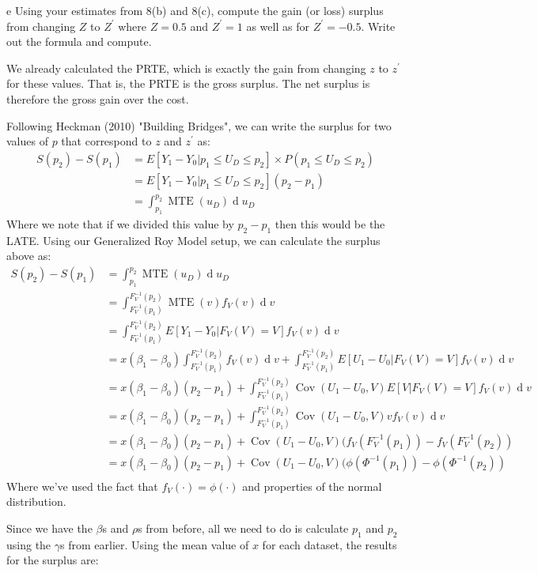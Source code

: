 \documentclass{article}
\begin{document}
\begin{problem}{e}
Using your estimates from 8(b) and 8(c), compute the gain (or loss) surplus from changing $Z$ to $Z^{\prime}$ where $Z=0.5$ and $Z^{\prime}=1$ as well as for $Z^{\prime}=-0.5$. Write out the formula and compute.
\end{problem}
\begin{solution}
We already calculated the PRTE, which is exactly the gain from changing $z$ to $z^\prime$ for these values. That is, the PRTE is the gross surplus. The net surplus is therefore the gross gain over the cost.

Following Heckman (2010) "Building Bridges", we can write the surplus for two values of $p$ that correspond to $z$ and $z^\prime$ as:
\begin{align*}
    S(p_2) - S(p_1) &= E[Y_1-Y_0| p_1 \leq U_D \leq p_2] \times P(p_1 \leq U_D \leq p_2) \\
    &= E[Y_1-Y_0| p_1 \leq U_D \leq p_2] (p_2-p_1) \\
    &= \int_{p_1}^{p_2} \operatorname{MTE}(u_D) \operatorname{d} u_D
\end{align*}
Where we note that if we divided this value by $p_2-p_1$ then this would be the LATE. Using our Generalized Roy Model setup, we can calculate the surplus above as:
\begin{align*}
    S(p_2) - S(p_1) &= \int_{p_1}^{p_2} \operatorname{MTE}(u_D) \operatorname{d} u_D \\
    &= \int_{F_V^{-1}(p_1)}^{F_V^{-1}(p_2)} \operatorname{MTE}(v) f_V(v) \operatorname{d} v \\
    &= \int_{F_V^{-1}(p_1)}^{F_V^{-1}(p_2)} E[Y_1-Y_0 | F_V(V)=V] f_V(v) \operatorname{d} v \\
    &= x(\beta_1-\beta_0) \int_{F_V^{-1}(p_1)}^{F_V^{-1}(p_2)}f_V(v)\operatorname{d} v  + 
    \int_{F_V^{-1}(p_1)}^{F_V^{-1}(p_2)} E[U_1 - U_0 | F_V(V)=V] f_V(v) \operatorname{d} v \\
    &= x(\beta_1-\beta_0) (p_2-p_1)  + 
    \int_{F_V^{-1}(p_1)}^{F_V^{-1}(p_2)}\operatorname{Cov}(U_1 - U_0,V) E[V | F_V(V)=V] f_V(v) \operatorname{d} v \\
    &= x(\beta_1-\beta_0) (p_2-p_1)  + 
    \int_{F_V^{-1}(p_1)}^{F_V^{-1}(p_2)}\operatorname{Cov}(U_1 - U_0,V) v f_V(v) \operatorname{d} v \\
    &= x(\beta_1-\beta_0) (p_2-p_1) + \operatorname{Cov}(U_1 - U_0,V) (f_V(F_V^{-1}(p_1)) - f_V(F_V^{-1}(p_2))  \\
    &= x(\beta_1-\beta_0) (p_2-p_1) + \operatorname{Cov}(U_1 - U_0,V) (\phi(\Phi^{-1}(p_1)) - \phi(\Phi^{-1}(p_2))  \\
\end{align*}
Where we've used the fact that $f_V(\cdot)=\phi(\cdot)$ and properties of the normal distribution.

Since we have the $\beta$s and $\rho$s from before, all we need to do is calculate $p_1$ and $p_2$ using the $\gamma$s from earlier. Using the mean value of $x$ for each dataset, the results for the surplus are:
\begin{table}[H]
    \centering
    
\end{table}


\end{solution}
\end{document}
